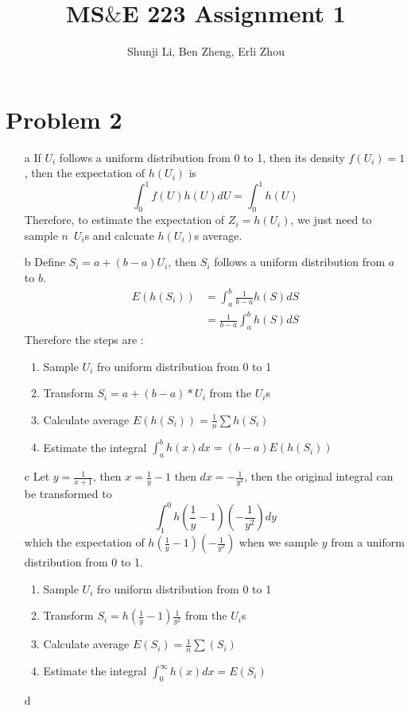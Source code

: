 \documentclass[12pt,a4paper]{article}
\author{Shunji Li, Ben Zheng, Erli Zhou}
\title{MS$\&$E 223 Assignment 1}
\begin{document}
\maketitle
\section*{Problem 2}
\begin{itemize}
\item[a] If $U_i$ follows a uniform distribution from 0 to 1, then its density $f(U_i) = 1$, then the expectation of $h(U_i)$ is 
$$
\int_{0}^1 f(U)h(U) dU = \int_0^1 h(U)
$$
Therefore, to estimate the expectation of $Z_i = h(U_i)$, we just need to sample $n$ $\, U_i$s and calcuate $h(U_i)$s average. 
\item[b] Define $S_i = a + (b-a)U_i$, then $S_i$ follows a uniform distribution from $a$ to $b$. 
\begin{align*}
E(h(S_i)) &= \int_a^b \frac{1}{b-a} h(S) dS\\
& = \frac{1}{b-a} \int_a^b h(S) dS
\end{align*}
Therefore the steps are :
\begin{enumerate}
\item Sample $U_i$ fro uniform distribution from 0 to 1
\item Transform $S_i = a + (b-a)*U_i$ from the $U_i$s
\item Calculate average $E(h(S_i)) = \frac{1}{n}\sum h(S_i)$
\item Estimate the integral $\int_a^b h(x) dx = (b-a) E(h(S_i))$
\end{enumerate}
\item[c]
Let $y = \frac{1}{x+1}$, then $x = \frac{1}{y} - 1$ then $dx = -\frac{1}{y^2}$, then the original integral can be transformed to 
$$
\int_1^0 h(\frac{1}{y}-1)(-\frac{1}{y^2}) dy 
$$
which the expectation of $h(\frac{1}{y}-1)(-\frac{1}{y^2})$ when we sample $y$ from a uniform distribution from 0 to 1. 
\begin{enumerate}
\item Sample $U_i$ fro uniform distribution from 0 to 1
\item Transform $S_i = h(\frac{1}{y}-1)\frac{1}{y^2}$ from the $U_i$s
\item Calculate average $E(S_i) = \frac{1}{n}\sum (S_i)$
\item Estimate the integral $\int_0^\infty h(x) dx =E(S_i)$
\end{enumerate}
\item[d]
\begin{enumerate}

\end{enumerate}
\end{itemize}
\end{document}
